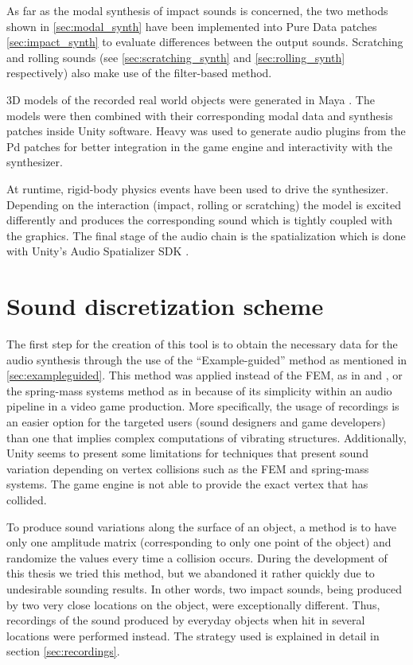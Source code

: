 As far as the modal synthesis of impact sounds is concerned, the two methods shown in \ref{sec:modal_synth} have been implemented into Pure Data patches \ref{sec:impact_synth} to evaluate differences between the output sounds. Scratching and rolling sounds (see \ref{sec:scratching_synth} and \ref{sec:rolling_synth} respectively) also make use of the filter-based method.

3D models of the recorded real world objects were generated in Maya \cite{bib:maya}. The models were then combined with their corresponding modal data and synthesis patches inside Unity\textsuperscript{\textregistered} software. Heavy was used to generate audio plugins from the Pd patches for better integration in the game engine and interactivity with the synthesizer. 

At runtime, rigid-body physics events have been used to drive the synthesizer. Depending on the interaction (impact, rolling or scratching) the model is excited differently and produces the corresponding sound which is tightly coupled with the graphics. The final stage of the audio chain is the spatialization which is done with Unity's Audio Spatializer SDK \cite{bib:unity_doc}.

\section{Sound discretization scheme}\label{sec:discretization}

The first step for the creation of this tool is to obtain the necessary data for the audio synthesis through the use of the ``Example-guided'' method as mentioned in \ref{sec:exampleguided}. This method was applied instead of the \gls{FEM}, as in \cite{director2001synthesizing} and \cite{o2002synthesizing}, or the spring-mass systems method as in \cite{raghuvanshi2006interactive} because of its simplicity within an audio pipeline in a video game production. More specifically, the usage of recordings is an easier option for the targeted users (sound designers and game developers) than one that implies complex computations of vibrating structures. Additionally, Unity\textsuperscript{\textregistered} seems to present some limitations for techniques that present sound variation depending on vertex collisions such as the \gls{FEM} and spring-mass systems. The game engine is not able to provide the exact vertex that has collided. 

To produce sound variations along the surface of an object, a method is to have only one amplitude matrix (corresponding to only one point of the object) and randomize the values every time a collision occurs. During the development of this thesis we tried this method, but we abandoned it rather quickly due to undesirable sounding results. In other words, two impact sounds, being produced by two very close locations on the object, were exceptionally different. Thus, recordings of the sound produced by everyday objects when hit in several locations were performed instead. The strategy used is explained in detail in section \ref{sec:recordings}.

